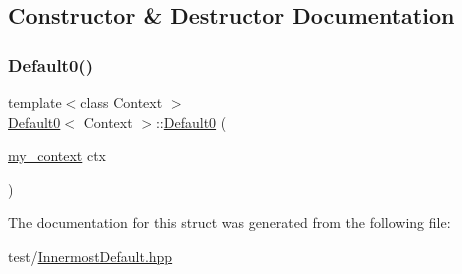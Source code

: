 \subsection{Constructor \& Destructor Documentation}
\mbox{\label{struct_default0_ab2ba7bbdcc04e41a362c2e87e7a66b6f}} 
\subsubsection{\texorpdfstring{Default0()}{Default0()}}
{\footnotesize\ttfamily template$<$class Context $>$ \\
\mbox{\hyperlink{struct_default0}{Default0}}$<$ Context $>$\+::\mbox{\hyperlink{struct_default0}{Default0}} (\begin{DoxyParamCaption}\item[{\mbox{\hyperlink{struct_default0_abe729d763308952bd5df854e44ea8b81}{my\+\_\+context}}}]{ctx }\end{DoxyParamCaption})\hspace{0.3cm}{\ttfamily [inline]}}



The documentation for this struct was generated from the following file\+:\begin{DoxyCompactItemize}
\item 
test/\mbox{\hyperlink{_innermost_default_8hpp}{Innermost\+Default.\+hpp}}\end{DoxyCompactItemize}
